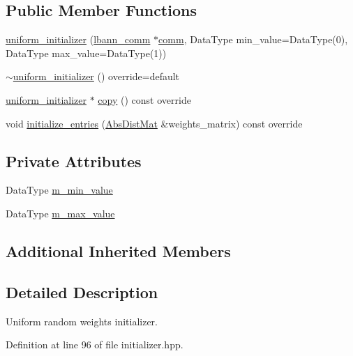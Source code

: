 \subsection*{Public Member Functions}
\begin{DoxyCompactItemize}
\item 
\hyperlink{classlbann_1_1uniform__initializer_a97376dcd91f5dfe1d6f2a6aea2c328e4}{uniform\+\_\+initializer} (\hyperlink{classlbann_1_1lbann__comm}{lbann\+\_\+comm} $\ast$\hyperlink{file__io_8cpp_ab048c6f9fcbcfaa57ce68b00263dbebe}{comm}, Data\+Type min\+\_\+value=Data\+Type(0), Data\+Type max\+\_\+value=Data\+Type(1))
\item 
\hyperlink{classlbann_1_1uniform__initializer_ad8e07c157466058d6304d8469e34c7e0}{$\sim$uniform\+\_\+initializer} () override=default
\item 
\hyperlink{classlbann_1_1uniform__initializer}{uniform\+\_\+initializer} $\ast$ \hyperlink{classlbann_1_1uniform__initializer_aeff019b94438eeb847d7236d5d28cdb3}{copy} () const override
\item 
void \hyperlink{classlbann_1_1uniform__initializer_a23461a8ab897f0aeafc524a61cb0f4eb}{initialize\+\_\+entries} (\hyperlink{base_8hpp_a9a697a504ae84010e7439ffec862b470}{Abs\+Dist\+Mat} \&weights\+\_\+matrix) const override
\end{DoxyCompactItemize}
\subsection*{Private Attributes}
\begin{DoxyCompactItemize}
\item 
Data\+Type \hyperlink{classlbann_1_1uniform__initializer_aa8c380143e8804319b0ee2e277a4969c}{m\+\_\+min\+\_\+value}
\item 
Data\+Type \hyperlink{classlbann_1_1uniform__initializer_a208a9e447137f182b5c2141a54c6e6cd}{m\+\_\+max\+\_\+value}
\end{DoxyCompactItemize}
\subsection*{Additional Inherited Members}


\subsection{Detailed Description}
Uniform random weights initializer. 

Definition at line 96 of file initializer.\+hpp.



